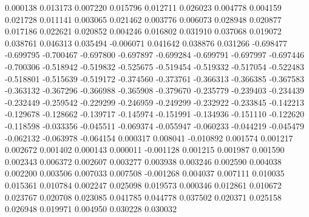 0.000138
0.013173
0.007220
0.015796
0.012711
0.026023
0.004778
0.004159
0.021728
0.011141
0.003065
0.021462
0.003776
0.006073
0.028948
0.020877
0.017186
0.022621
0.020852
0.004246
0.016802
0.031910
0.037068
0.019072
0.038761
0.046313
0.035494
-0.006071
0.041642
0.038876
0.031266
-0.698477
-0.699795
-0.700467
-0.697800
-0.697897
-0.699284
-0.699791
-0.697997
-0.697446
-0.700306
-0.518942
-0.519832
-0.525675
-0.519454
-0.519332
-0.517054
-0.522483
-0.518801
-0.515639
-0.519172
-0.374560
-0.373761
-0.366313
-0.366385
-0.367583
-0.363132
-0.367296
-0.366988
-0.365908
-0.379670
-0.235779
-0.239403
-0.234439
-0.232449
-0.259542
-0.229299
-0.246959
-0.249299
-0.232922
-0.233845
-0.142213
-0.129678
-0.128662
-0.139717
-0.145974
-0.151991
-0.134936
-0.151110
-0.122620
-0.118598
-0.033356
-0.045511
-0.069374
-0.055947
-0.060233
-0.044219
-0.045479
-0.062132
-0.063978
-0.064154
0.000317
0.008041
-0.010892
0.001574
0.001217
0.002672
0.001402
0.000143
0.000011
-0.001128
0.001215
0.001987
0.001590
0.002343
0.006372
0.002607
0.003277
0.003938
0.003246
0.002590
0.004038
0.002200
0.003506
0.007033
0.007508
-0.001268
0.004037
0.007111
0.010035
0.015361
0.010784
0.002247
0.025098
0.019573
0.000346
0.012861
0.010672
0.023767
0.020708
0.023085
0.041785
0.044778
0.037502
0.020371
0.025158
0.026948
0.019971
0.004950
0.030228
0.030032
